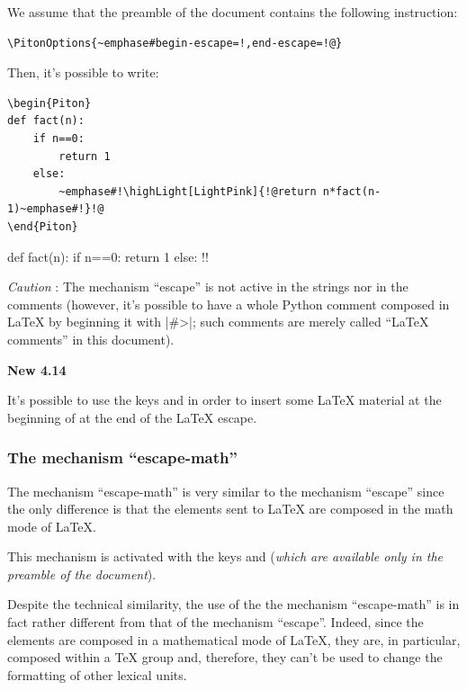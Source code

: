 \documentclass{article}
\begin{document}
\medskip
We assume that the preamble of the document contains the following
instruction:

\begin{Verbatim}
\PitonOptions{~emphase#begin-escape=!,end-escape=!@}
\end{Verbatim}

\medskip
Then, it's possible to write:
\begin{Verbatim}
\begin{Piton}
def fact(n):
    if n==0:
        return 1
    else:
        ~emphase#!\highLight[LightPink]{!@return n*fact(n-1)~emphase#!}!@
\end{Piton}
\end{Verbatim}

   \begin{Piton}
def fact(n):
    if n==0:
        return 1
    else:
        !!
   \end{Piton}



\bigskip
\emph{Caution} : The mechanism ``escape'' is not active in the strings nor in
the comments (however, it's possible to have a whole Python comment
composed in LaTeX by beginning it with |#>|; such comments are merely called
``LaTeX comments'' in this document).

\bigskip
{}
\colorbox{yellow!50}{\textbf{New 4.14}}

\smallskip
\nobreak
It's possible to use the keys  and
 in order to insert some LaTeX material at the
beginning of at the end of the LaTeX escape.


\subsubsection{The mechanism ``escape-math''}

The mechanism ``escape-math'' is very similar to the mechanism ``escape''
since the only difference is that the elements sent to LaTeX are composed in
the math mode of LaTeX.

This mechanism is activated with the keys  and
 (\emph{which are available only in the preamble of the
document}). 

Despite the technical similarity, the use of the the mechanism
``escape-math'' is in fact rather different from that of the mechanism
``escape''. Indeed, since the elements are composed in a mathematical mode
of LaTeX, they are, in particular, composed within a TeX group and, therefore,
they can't be used to change the formatting of other lexical units.
\end{document}
